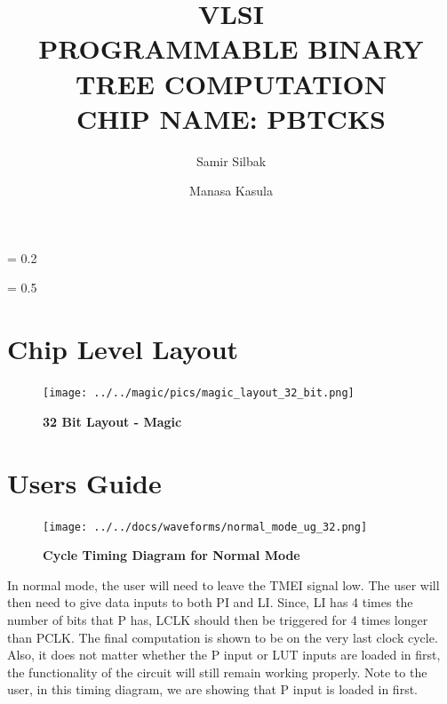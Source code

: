\documentclass[a4paper]{article}
\title{
    \vspace{2in}
    \textbf{VLSI \\}
    \vspace{10pt}
    \textbf{PROGRAMMABLE BINARY TREE COMPUTATION\\}
    \vspace{10pt}
    \textbf{CHIP NAME: PBTCKS}
    \vspace{2in}
}
\author[1]{Samir Silbak}
\author[2]{Manasa Kasula}
\affil[1]{silbaksr@mail.uc.edu}
\affil[2]{kasulama@mail.uc.edu
    \vspace{10pt}
}
\affil[1]{(513) 207-0687}
\affil[2]{(847) 612-7364
    \vspace{2.0in}
}
\begin{document}
%
\maketitle
\newpage
\parskip = 0.2\baselineskip
\newpage
\tableofcontents
\newpage
\listoffigures
\listoftables
\lstlistoflistings
\parskip = 0.5\baselineskip
\newpage

\newpage

\newpage

\section{\textbf{Chip Level Layout}}

    \begin{figure}[H]
        \centering
        \texttt{[image: ../../magic/pics/magic\_layout\_32\_bit.png]}
        \caption{\textbf{32 Bit Layout - Magic}}
        \label{fig:gg}
    \end{figure}


\section{\textbf{Users Guide}}


    \begin{figure}[H]
        \centering
        \texttt{[image: ../../docs/waveforms/normal\_mode\_ug\_32.png]}
        \caption{\textbf{Cycle Timing Diagram for Normal Mode}}
        \label{fig:gg}
    \end{figure}

    In normal mode, the user will need to leave the TMEI signal low. The user will then need to give data inputs
    to both PI and LI. Since, LI has 4 times the number of bits that P has, LCLK should then be triggered for
    4 times longer than PCLK. The final computation is shown to be on the very last clock cycle. Also, it does not
    matter whether the P input or LUT inputs are loaded in first, the functionality of the circuit will still remain
    working properly. Note to the user, in this timing diagram, we are showing that P input is loaded in first.
\end{document}
